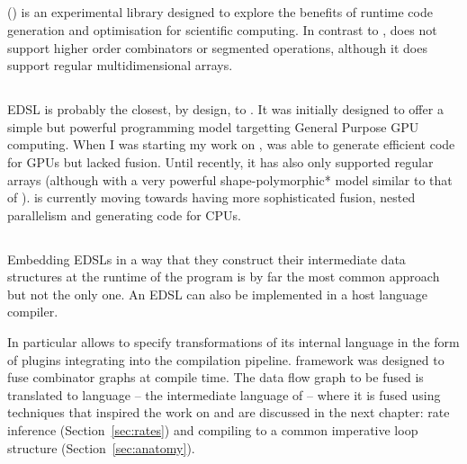 \documentclass[preamble.tex]{subfiles}
\begin{document}
\subsection{}
\label{sec:DESOLA}

 () \cite{RMKB06} is an experimental  library designed to explore the benefits of runtime code generation and optimisation for scientific computing. In contrast to \DPH,  does not support higher order combinators or segmented operations, although it does support regular multidimensional arrays.


\subsection{}

 EDSL\iedsl \cite{CKL+11, McDonell:2013wi, CliftonEverest:2014vi} is probably the closest, by design, to \LiveFusion. It was initially designed to offer a simple but powerful programming model targetting General Purpose GPU computing. When I was starting my work on \LiveFusion,  was able to generate efficient code for GPUs but lacked fusion. Until recently, it has also only supported regular arrays (although with a very powerful \*shape-polymorphic* model similar to that of \Repa \cite{KCL+10}).  is currently moving towards having more sophisticated fusion, nested parallelism and generating code for CPUs.


\subsection{\FlowFusion}
\label{sec:Fronted-FlowFusion}

Embedding EDSLs in a way that they construct their intermediate data structures at the runtime of the program is by far the most common approach but not the only one. An EDSL can also be implemented in a host language compiler.

In particular \GHC allows to specify transformations of its internal  language in the form of plugins integrating into the compilation pipeline. \FlowFusion framework \cite{FlowFusion, FusingFiltersILP} was designed to fuse combinator graphs at compile time. The data flow graph to be fused is translated to  language -- the intermediate language of  \cite{DDC} -- where it is fused using  techniques that inspired the work on \LiveFusion and are discussed in the next chapter: rate inference (Section~\ref{sec:rates}) and compiling to a common imperative loop structure (Section~\ref{sec:anatomy}).
\end{document}
